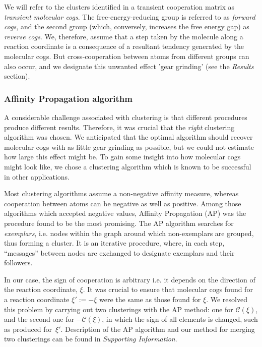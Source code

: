 We will refer to the clusters identified in a transient cooperation matrix as \emph{transient molecular cogs}.
The free-energy-reducing group is referred to as \emph{forward cogs}, and the second group (which, conversely, increases the free energy gap) as \emph{reverse cogs}.
We, therefore, assume that a step taken by the molecule along a reaction coordinate is a consequence of a resultant tendency generated by the molecular cogs.
But cross-cooperation between atoms from different groups can also occur, and we {\color{black}designate} this unwanted effect 'gear grinding' (see the \emph{Results} section).

\subsubsection*{Affinity Propagation algorithm}
A considerable challenge associated with clustering is that different procedures produce different results.
Therefore, it was crucial that the \emph{right} clustering algorithm was chosen.
We anticipated that the optimal algorithm should recover molecular cogs with as little gear grinding as possible, but we could not estimate how large this effect might be.
To gain some insight into how molecular cogs might look like, we chose a clustering algorithm which is known to be successful in other applications.

Most clustering algorithms assume a non-negative affinity measure, whereas cooperation between atoms can be negative as well as positive.
Among those algorithms which accepted negative values, Affinity Propagation (AP) was the procedure found to be the most promising\cite{frey2007clustering}.
The AP algorithm searches for \emph{exemplars}, i.e. nodes within the graph around which non-exemplars are grouped, thus forming a cluster.
It is an iterative procedure, where, in each step, ``messages'' between nodes are exchanged to designate exemplars and their followers.

In our case, the sign of cooperation is arbitrary i.e. it depends on the direction of the reaction coordinate, $\xi$.
It was crucial to ensure that molecular cogs found for a reaction coordinate $\xi':=-\xi$ were the same as those found for $\xi$.
We resolved this problem by carrying out two clusterings with the AP method: one for $\mathcal{C}(\xi)$, and the second one for $-\mathcal{C}(\xi)$, in which the sign of all elements is changed, such as produced for~$\xi'$.
Description of the AP algorithm and our method for merging two clusterings can be found in \emph{Supporting Information}.


